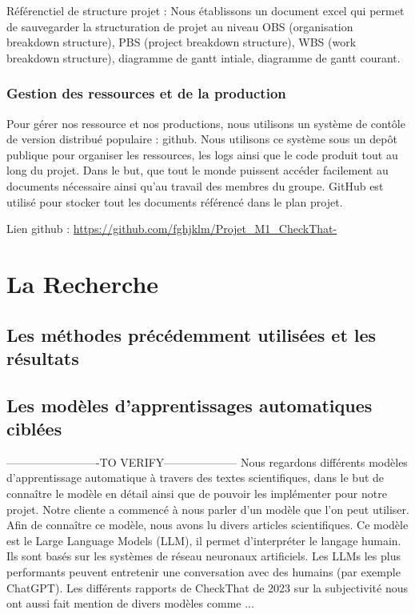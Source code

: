 \documentclass[11pt]{rapport_class}
\begin{document}
Référenctiel de structure projet : Nous établissons un document excel qui permet de sauvegarder la structuration de projet au niveau OBS (organisation breakdown structure), PBS (project breakdown structure), WBS (work breakdown structure), diagramme de gantt intiale, diagramme de gantt courant.

\subsection{Gestion des ressources et de la production}
Pour gérer nos ressource et nos productions, nous utilisons un système de contôle de version distribué populaire : github. Nous utilisons ce système sous un depôt publique pour organiser les ressources, les logs ainsi que le code produit tout au long du projet. Dans le but, que tout le monde puissent accéder facilement au documents nécessaire ainsi qu’au travail des membres du groupe. GitHub est utilisé pour stocker tout les documents référencé dans le plan projet.

Lien github : \url{https://github.com/fghjklm/Projet_M1_CheckThat-}


\chapter{La Recherche}
\section{Les méthodes précédemment utilisées et les résultats}

\section{Les modèles d'apprentissages automatiques ciblées}
-------------------------TO VERIFY--------------------
Nous regardons différents modèles d’apprentissage automatique à travers des textes scientifiques, dans le but de connaître le modèle en détail ainsi que de pouvoir les implémenter pour notre projet. Notre cliente a commencé à nous parler d’un modèle que l’on peut utiliser. Afin de connaître ce modèle, nous avons lu divers articles scientifiques. Ce modèle est le Large Language Models (LLM), il permet d’interpréter le langage humain. Ils sont basés sur les systèmes de réseau neuronaux artificiels. Les LLMs les plus performants peuvent entretenir une conversation avec des humains (par exemple ChatGPT). 
Les différents rapports de CheckThat de 2023 sur la subjectivité nous ont aussi fait mention de divers modèles comme ...
\end{document}
